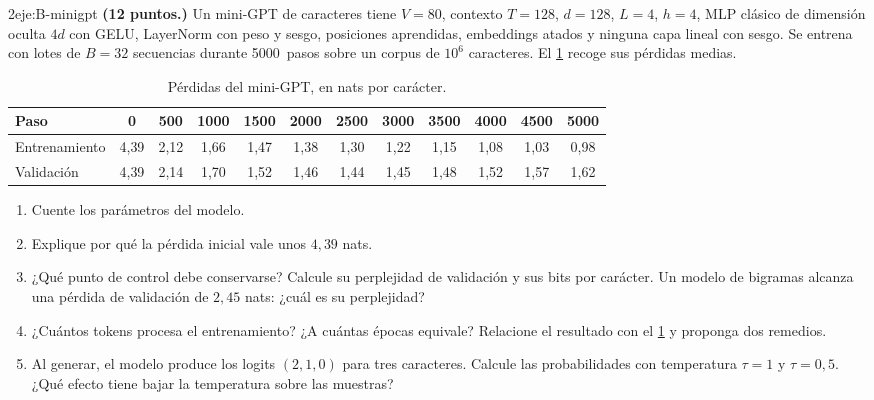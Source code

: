 \begin{ejercicio}{2}{eje:B-minigpt}
\textbf{(12 puntos.)} Un mini-GPT de caracteres tiene $V=80$, contexto $T=128$, $d=128$, $L=4$, $h=4$, MLP clásico de dimensión oculta $4d$ con GELU, LayerNorm con peso y sesgo, posiciones aprendidas, embeddings atados y ninguna capa lineal con sesgo. Se entrena con lotes de $B=32$ secuencias durante 5000~pasos sobre un corpus de $10^{6}$ caracteres. El \cref{tab:curvas} recoge sus pérdidas medias.

\begin{table}[H]
\centering\small
\setlength{\tabcolsep}{3.6pt}
\caption{Pérdidas del mini-GPT, en nats por carácter.}\label{tab:curvas}
\begin{tabular}{@{}lccccccccccc@{}}
\toprule
Paso & 0 & 500 & 1000 & 1500 & 2000 & 2500 & 3000 & 3500 & 4000 & 4500 & 5000 \\
\midrule
Entrenamiento & 4{,}39 & 2{,}12 & 1{,}66 & 1{,}47 & 1{,}38 & 1{,}30 & 1{,}22 & 1{,}15 & 1{,}08 & 1{,}03 & 0{,}98 \\
Validación & 4{,}39 & 2{,}14 & 1{,}70 & 1{,}52 & 1{,}46 & 1{,}44 & 1{,}45 & 1{,}48 & 1{,}52 & 1{,}57 & 1{,}62 \\
\bottomrule
\end{tabular}
\end{table}

\begin{enumerate}[label=(\alph*)]
  \item {} Cuente los parámetros del modelo.
  \item {} Explique por qué la pérdida inicial vale unos $4{,}39$ nats.
  \item {} ¿Qué punto de control debe conservarse? Calcule su perplejidad de validación y sus bits por carácter. Un modelo de bigramas alcanza una pérdida de validación de $2{,}45$ nats: ¿cuál es su perplejidad?
  \item {} ¿Cuántos tokens procesa el entrenamiento? ¿A cuántas épocas equivale? Relacione el resultado con el \cref{tab:curvas} y proponga dos remedios.
  \item {} Al generar, el modelo produce los logits $(2,1,0)$ para tres caracteres. Calcule las probabilidades con temperatura $\tau=1$ y $\tau=0{,}5$. ¿Qué efecto tiene bajar la temperatura sobre las muestras?
\end{enumerate}
\end{ejercicio}
